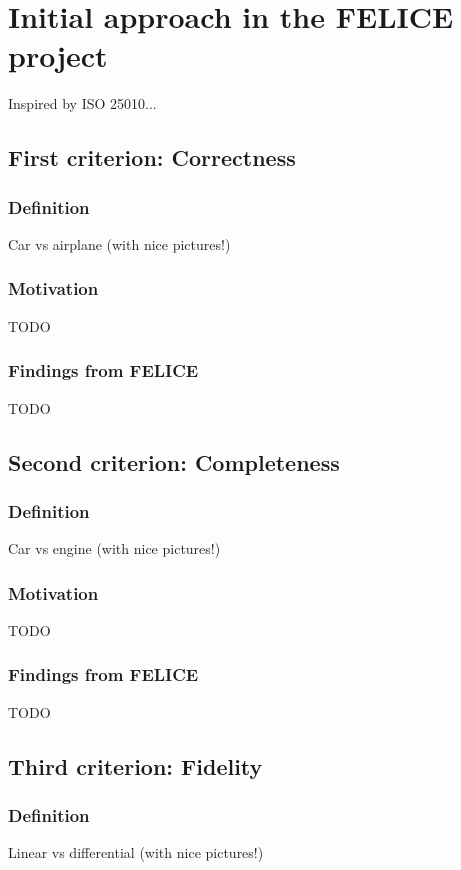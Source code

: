\documentclass[9pt,conference]{IEEEtran}
\begin{document}
    \section{Initial approach in the FELICE project}
    Inspired by ISO 25010...

    \subsection{First criterion: Correctness}
    
    \subsubsection{Definition}
    Car vs airplane (with nice pictures!)

    \subsubsection{Motivation}
    TODO

    \subsubsection{Findings from FELICE}
    TODO

    \subsection{Second criterion: Completeness}
    
    \subsubsection{Definition}
    Car vs engine (with nice pictures!)

    \subsubsection{Motivation}
    TODO

    \subsubsection{Findings from FELICE}
    TODO

    \subsection{Third criterion: Fidelity}
    
    \subsubsection{Definition}
    Linear vs differential (with nice pictures!)
\end{document}
